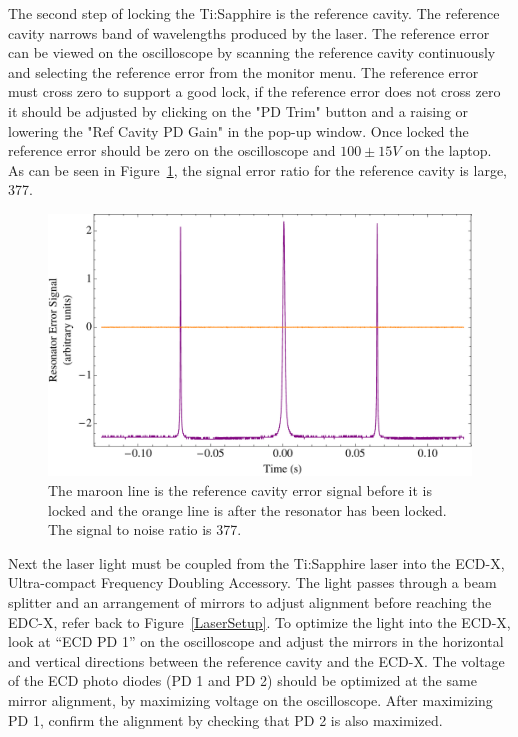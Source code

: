 \documentclass[prb,preprint]{revtex4-1}
\begin{document}
The second step of locking the Ti:Sapphire is the reference cavity. The reference cavity narrows  band of wavelengths produced by the laser. The reference error can be viewed on the oscilloscope by scanning the reference cavity continuously and selecting the reference error from the monitor menu. The reference error must cross zero to support a good lock, if the reference error does not cross zero it should be adjusted by clicking on the "PD Trim" button and a raising or lowering the "Ref Cavity PD Gain" in the pop-up window. Once locked the reference error should be zero on the oscilloscope and $100 \pm 15 V$ on the laptop. As can be seen in Figure~\ref{ResonatorError}, the signal error ratio for the reference cavity is large, 377.

\begin{figure}[h!]
\centering
\includegraphics[width=6in]{ResonatorError.pdf}
\caption{The maroon line is the reference cavity error signal before it is locked and the orange line is after the resonator has been locked. The signal to noise ratio is 377.}
\label{ResonatorError}
\end{figure}

Next the laser light must be coupled from the Ti:Sapphire laser into the ECD-X, Ultra-compact Frequency Doubling Accessory. The light passes through a beam splitter and an arrangement of mirrors to adjust alignment before reaching the EDC-X, refer back to Figure~\ref{LaserSetup}. To optimize the light into the ECD-X, look at ``ECD PD 1'' on the oscilloscope and adjust the mirrors in the horizontal and vertical directions between the reference cavity and the ECD-X. The voltage of the ECD photo diodes (PD 1 and PD 2) should be optimized at the same mirror alignment, by maximizing voltage on the oscilloscope. After maximizing PD 1, confirm the alignment by checking that PD 2 is also maximized.
\end{document}
